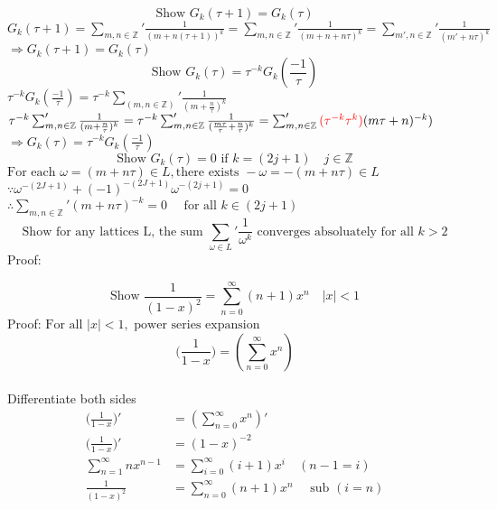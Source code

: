 \documentclass{book}
\begin{document}
\noindent
\[\text{Show } G_{k}(\tau + 1) = G_{k}(\tau)\]
$G_{k}(\tau + 1) = \sum_{m, n \in \mathbb{Z}}' \frac{1}{(m+n(\tau+1))^k} = \sum_{m, n \in \mathbb{Z}}' \frac{1}{(m + n + n\tau)^k} = \sum_{m', n \in \mathbb{Z} }' \frac{1}{(m' + n\tau)^k}$\\
$\Rightarrow G_{k}(\tau + 1) = G_{k}(\tau)$\\

\noindent
\[\text{Show } G_{k}(\tau) = \tau^{-k} G_{k}(\frac{-1}{\tau})\]
$\tau^{-k} G_{k}(\frac{-1}{\tau}) =  \tau^{-k} \sum_{(m, n \in \mathbb{Z} )}' \frac{1}{(m+\frac{n}{\tau})^{k}}$\\
$\tau^{-k} \sum_{m, n \in \mathbb{Z}}' \frac{1}{(m + \frac{n}{\tau})^{k}} = \tau^{-k} \sum_{m, n \in \mathbb{Z}}' \frac{1}{(\frac{m\tau}{\tau} + \frac{n}{\tau})^{k}} = \sum_{m, n \in \mathbb{Z}}' \textcolor{red}{(\tau^{-k}\tau^{k})} (m\tau + n)^{-k})$\\
$\Rightarrow G_{k}(\tau) = \tau^{-k} G_{k}(\frac{-1}{\tau})$\\


\noindent
\[\text{Show }G_{k}(\tau) = 0 \text{ if } k = (2j+1) \quad j \in \mathbb{Z} \]
$\text{For each }\omega = (m+n\tau) \in L, \text{there exists } -\omega = -(m+n\tau) \in L $\\
$\because \omega ^{-(2J+1)} + (-1)^{-(2J+1)}\omega^{-(2j+1)} = 0$\\
$\therefore \sum_{m,n \in \mathbb{Z}}' (m+n\tau)^{-k} = 0\quad \text{ for all } k \in (2j+1)$\\

\noindent
\[\text{Show for any lattices L, the sum } \sum_{\omega \in \mathit{L}}' \frac{1}{\omega^{k}} \text{ converges absoluately for all } k > 2 \]
Proof:


\pagebreak
\noindent
\[\text{Show }\frac{1}{(1-x)^2} = \sum_{n=0}^{\infty} (n+1)x^n \quad |x| < 1\]
Proof:
$\text{For all } |x| < 1, \text{ power series expansion} $\\
\[(\frac{1}{1-x}\big) = (\sum_{n=0}^{\infty} x^n)\]\\
Differentiate both sides\\
\begin{equation}
\begin{aligned}
(\frac{1}{1-x}\big)' &= (\sum_{n=0}^{\infty} x^n)' \\
(\frac{1}{1-x}\big)' &= (1-x)^{-2}\\ 
\sum_{n=1}^{\infty} nx^{n-1} &= \sum_{i=0}^{\infty} (i+1)x^{i} \quad (n-1=i)\\
\frac{1}{(1-x)^2} &= \sum_{n=0}^{\infty} (n+1)x^{n} \quad \text{ sub }(i = n)\\
\end{aligned}
\end{equation}
\end{document}
